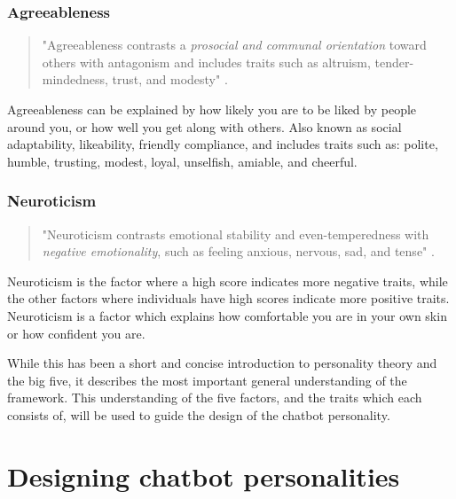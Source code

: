 \subsubsection{Agreeableness}
\begin{quote}
    "Agreeableness contrasts a \textit{prosocial and communal orientation} toward others with antagonism and includes traits such as altruism, tender-mindedness, trust, and modesty" \citep[p.121]{John1999}.
\end{quote}

Agreeableness can be explained by how likely you are to be liked by people around you, or how well you get along with others. Also known as social adaptability, likeability, friendly compliance, and includes traits such as: polite, humble, trusting, modest, loyal, unselfish, amiable, and cheerful.

\subsubsection{Neuroticism}
\begin{quote}
    "Neuroticism contrasts emotional stability and even-temperedness with \textit{negative emotionality}, such as feeling anxious, nervous, sad, and tense" \citep[p.121]{John1999}.
\end{quote}

Neuroticism is the factor where a high score indicates more negative traits, while the other factors where individuals have high scores indicate more positive traits. Neuroticism is a factor which explains how comfortable you are in your own skin or how confident you are.

\vspace{2,5mm}

While this has been a short and concise introduction to personality theory and the big five, it describes the most important general understanding of the framework. This understanding of the five factors, and the traits which each consists of, will be used to guide the design of the chatbot personality.

\vspace{5mm} %

\section{Designing chatbot personalities} 


